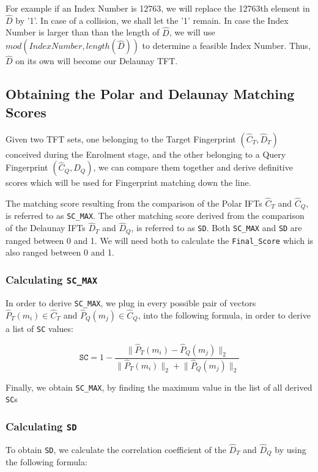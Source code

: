 \documentclass[fyp]{socreport}
\newcommand\norm[1]{\lVert#1\rVert}
\begin{document}
For example if an Index Number is 12763, we will replace the 12763th element in $\widehat{D}$ by '1'. In case of a collision, we shall let the '1' remain. In case the Index Number is larger than than the length of $\widehat{D}$, we will use $mod(Index Number, length(\widehat{D}))$ to determine a feasible Index Number. Thus, $\widehat{D}$ on its own will become our Delaunay TFT.

\subsection{Obtaining the Polar and Delaunay Matching Scores}
Given two TFT sets, one belonging to the Target Fingerprint $(\widehat{C}_T, \widehat{D}_T)$ conceived during the Enrolment stage, and the other belonging to a Query Fingerprint $(\widehat{C}_Q, \widehat{D}_Q)$, we can compare them together and derive definitive scores which will be used for Fingerprint matching down the line.

The matching score resulting from the comparison of the Polar IFTs $\widehat{C}_T$ and $\widehat{C}_Q$, is referred to as \texttt{SC\_MAX}. The other matching score derived from the comparison of the Delaunay IFTs $\widehat{D}_T$ and $\widehat{D}_Q$, is referred to as \texttt{SD}. Both \texttt{SC\_MAX} and \texttt{SD} are ranged between 0 and 1. We will need both to calculate the \texttt{Final\_Score} which is also ranged between 0 and 1.

\subsubsection{Calculating \texttt{SC\_MAX}}
In order to derive \texttt{SC\_MAX}, we plug in every possible pair of vectors $\widehat{P}_T(m_i) \in \widehat{C}_T$ and $\widehat{P}_Q(m_j) \in \widehat{C}_Q$, into the following formula, in order to derive a list of \texttt{SC} values:

\begin{equation}
	\mathtt{SC} = 1 - \frac{\norm{\widehat{P}_T(m_i) - \widehat{P}_Q(m_j)}_2}{\norm{\widehat{P}_T(m_i)}_2 + \norm{\widehat{P}_Q(m_j)}_2}
\end{equation}

Finally, we obtain \texttt{SC\_MAX}, by finding the maximum value in the list of all derived \texttt{SC}s

\subsubsection{Calculating \texttt{SD}}
To obtain \texttt{SD}, we calculate the correlation coefficient of the $\widehat{D}_T$ and $\widehat{D}_Q$ by using the following formula:
\end{document}

